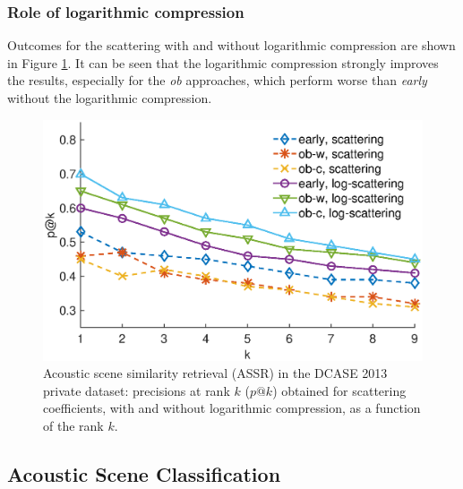\documentclass[journal]{IEEEtran}
\begin{document}
\subsubsection*{Role of logarithmic compression}

Outcomes for the scattering with and without logarithmic compression are shown in Figure \ref{fig:ASS_2}. It can be seen that the logarithmic compression strongly improves the results, especially for the \emph{ob} approaches, which perform worse than \emph{early} without the logarithmic compression.


\begin{figure}[t]
\begin{center}
\includegraphics[width=.9\columnwidth]{gfx/unsupervised_test1}
\caption{Acoustic scene similarity retrieval (ASSR) in the DCASE 2013 private dataset: precisions at rank $k$ ($p@k$) obtained for scattering coefficients, with and without logarithmic compression, as a function of the rank $k$.}
\label{fig:ASS_2}
\end{center}
\end{figure}

\subsection{Acoustic Scene Classification}
\end{document}
